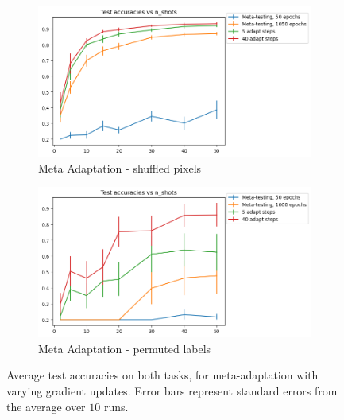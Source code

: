\documentclass{article} %
\theoremstyle{definition}
\begin{document}
\begin{figure}[h!]
	\centering
	\begin{subfigure}[b]{0.4\textwidth}
		\centering
		\includegraphics[width=\textwidth]{test_accuracies_pixels_const}
		\caption{Meta Adaptation - shuffled pixels}
	\end{subfigure}
	\hfill
	\begin{subfigure}[b]{0.4\textwidth}
		\centering
		\includegraphics[width=\textwidth]{test_accuracies_labels_const}
		\caption{Meta Adaptation - permuted labels}	 	
	\end{subfigure}
	\hfill
	\caption{Average test accuracies on both tasks, for meta-adaptation with varying gradient updates. Error bars represent standard errors from the average over $10$ runs.}	 
	\label{fig:results-pixels}
\end{figure}
\end{document}
